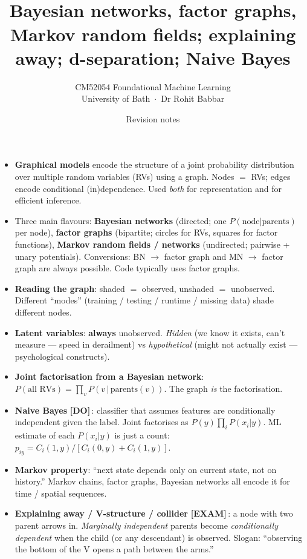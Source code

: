 \documentclass[11pt, a4paper]{article}
\title{\vspace{-1cm}{\Huge\bfseries Week 22 — Graphical Models} \\[0.4em]{\large Bayesian networks, factor graphs, Markov random fields; explaining away; d-separation; Naive Bayes}}
\author{\large CM52054 Foundational Machine Learning \\[0.2em]\normalsize University of Bath \,$\cdot$\, Dr Rohit Babbar}
\date{Revision notes}
\newcommand{\examflag}{\textcolor{tipBd}{\textbf{[EXAM]}}\,}
\newcommand{\doflag}{\textcolor{defBd}{\textbf{[DO]}}\,}
\begin{document}
\maketitle\thispagestyle{empty}\vspace{1em}

\begin{tldrbox}
\begin{itemize}[leftmargin=*]
  \item \textbf{Graphical models} encode the structure of a joint probability distribution over multiple random variables (RVs) using a graph. Nodes $=$ RVs; edges encode conditional (in)dependence. Used \emph{both} for representation and for efficient inference.
  \item Three main flavours: \textbf{Bayesian networks} (directed; one $P(\text{node}|\text{parents})$ per node), \textbf{factor graphs} (bipartite; circles for RVs, squares for factor functions), \textbf{Markov random fields / networks} (undirected; pairwise + unary potentials). Conversions: BN $\to$ factor graph and MN $\to$ factor graph are always possible. Code typically uses factor graphs.
  \item \textbf{Reading the graph}: shaded $=$ observed, unshaded $=$ unobserved. Different ``modes'' (training / testing / runtime / missing data) shade different nodes.
  \item \textbf{Latent variables}: \textbf{always} unobserved. \emph{Hidden} (we know it exists, can't measure — speed in derailment) vs \emph{hypothetical} (might not actually exist — psychological constructs).
  \item \textbf{Joint factorisation from a Bayesian network}: $P(\text{all RVs}) = \prod_v P(v\,|\,\text{parents}(v))$. The graph \emph{is} the factorisation.
  \item \textbf{Naive Bayes} \doflag{}: classifier that assumes features are conditionally independent given the label. Joint factorises as $P(y)\prod_i P(x_i|y)$. ML estimate of each $P(x_i|y)$ is just a count: $p_{iy} = C_i(1, y) / [C_i(0,y)+C_i(1,y)]$.
  \item \textbf{Markov property}: ``next state depends only on current state, not on history.'' Markov chains, factor graphs, Bayesian networks all encode it for time / spatial sequences.
  \item \textbf{Explaining away / V-structure / collider} \examflag{}: a node with two parent arrows in. \emph{Marginally independent} parents become \emph{conditionally dependent} when the child (or any descendant) is observed. Slogan: ``observing the bottom of the V opens a path between the arms.''

\end{itemize}
\end{tldrbox}
\end{document}
